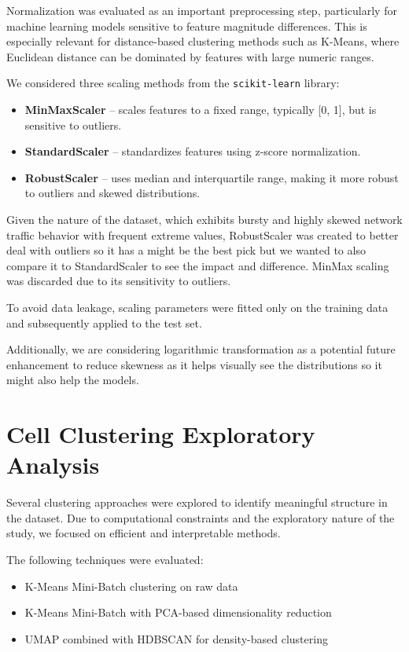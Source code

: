 \documentclass[conference]{IEEEtran}
\begin{document}
Normalization was evaluated as an important preprocessing step, particularly for machine learning models sensitive to feature magnitude differences. This is especially relevant for distance-based clustering methods such as K-Means, where Euclidean distance can be dominated by features with large numeric ranges.

We considered three scaling methods from the \texttt{scikit-learn} library:

\begin{itemize}
    \item \textbf{MinMaxScaler} – scales features to a fixed range, typically [0, 1], but is sensitive to outliers.
    \item \textbf{StandardScaler} – standardizes features using z-score normalization.
    \item \textbf{RobustScaler} – uses median and interquartile range, making it more robust to outliers and skewed distributions.
\end{itemize}

Given the nature of the dataset, which exhibits bursty and highly skewed network traffic behavior with frequent extreme values, RobustScaler was created to better deal with outliers so it has a might be the best pick but we wanted to also compare it to StandardScaler to see the impact and difference. MinMax scaling was discarded due to its sensitivity to outliers.

To avoid data leakage, scaling parameters were fitted only on the training data and subsequently applied to the test set.

Additionally, we are considering logarithmic transformation as a potential future enhancement to reduce skewness as it helps visually see the distributions so it might also help the models.

\section{Cell Clustering Exploratory Analysis}

Several clustering approaches were explored to identify meaningful structure in the dataset. Due to computational constraints and the exploratory nature of the study, we focused on efficient and interpretable methods.

The following techniques were evaluated:

\begin{itemize}
    \item K-Means Mini-Batch  clustering on raw data
    \item K-Means Mini-Batch with PCA-based dimensionality reduction
    \item UMAP combined with HDBSCAN for density-based clustering
\end{itemize}
\end{document}
